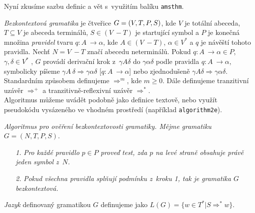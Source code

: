 \documentclass[11pt,a4paper,twocolumn]{article}
\begin{document}
	Nyní zkusíme sazbu definic a vět s~využitím balíku \texttt{amsthm}.
	
	\begin{definice}
		\label{sec:definice}
		\textit{Bezkontextová gramatika} je čtveřice $G = \linebreak (V,T,P,S)$, kde $V$ je totální abeceda,
		$T \subseteq V$ je abeceda terminálů, $S \in (V~- T)$ je startující symbol a $P$ \linebreak je konečná množina \textit{pravidel}
		tvaru $q$$: A~\rightarrow \alpha$, kde \linebreak $A \in (V~- T)$, $ \alpha \in V^*$ a $q$ je návěští tohoto pravidla. Nechť $N = V~- T$ značí abecedu neterminálů.
		Pokud $q$$: A~\rightarrow \alpha \in P$, $\gamma,\delta \in V^*$ , $G$  provádí derivační \linebreak krok z~$\gamma A\delta$ do $\gamma\alpha\delta$ podle pravidla $q$$: A~\rightarrow \alpha$, symbolicky píšeme 
		$\gamma A~\delta \Rightarrow \gamma\alpha\delta$ [$q$$: A~\rightarrow \alpha$] nebo zjednodušeně $\gamma A\delta \Rightarrow \gamma\alpha\delta$. Standardním způsobem definujeme $\Rightarrow^m$, kde $m \geq 0$. Dále definujeme
		tranzitivní uzávěr \linebreak $\Rightarrow^+$ a tranzitivně-reflexivní uzávěr $\Rightarrow^*$. \\[-0.2cm]
		
		Algoritmus můžeme uvádět podobně jako definice textově, nebo využít pseudokódu vysázeného ve vhodném prostředí (například \texttt{algorithm2e}).
	\end{definice}
	
	\begin{algoritmus}
		\textit{Algoritmus pro ověření bezkontextovosti gramatiky. Mějme gramatiku} $G = (N, T, P, S)$.
	\end{algoritmus}
	
	\begin{enumerate}
		\item[\textit{1.}] \textit{Pro každé pravidlo $p \in P$ proveď test, zda $p$ na levé straně obsahuje právě jeden symbol z~$N$.}
		\item[\textit{2.}] \textit{Pokud všechna pravidla splňují podmínku z~kroku 1, tak je gramatika $G$ bezkontextová.}
	\end{enumerate}

	\begin{definice}
		\textit{Jazyk} definovaný gramatikou $G$ definujeme jako $L(G) = \{w \in T^*$$\mid$$S \Rightarrow^* w\}$.
	\end{definice}
	
\end{document}
